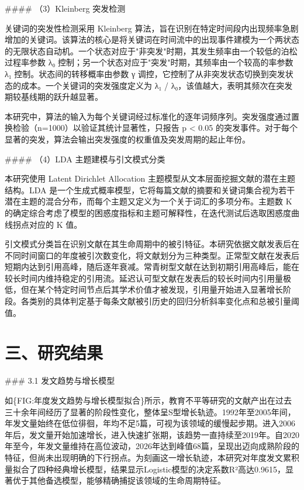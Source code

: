 \documentclass[12pt,a4paper]{article}
\begin{document}
\#\#\#\# （3）Kleinberg 突发检测

关键词的突发性检测采用 Kleinberg 算法，旨在识别在特定时间段内出现频率急剧增加的关键词。该算法的核心是将关键词在时间流中的出现事件建模为一个两状态的无限状态自动机。一个状态对应于"非突发"时期，其发生频率由一个较低的泊松过程率参数 λ₀ 控制；另一个状态对应于"突发"时期，其频率由一个较高的率参数 λ₁ 控制。状态间的转移概率由参数 γ 调控，它控制了从非突发状态切换到突发状态的成本。一个关键词的突发强度定义为 λ₁ / λ₀，该值越大，表明其频次在突发期较基线期的跃升越显著。

本研究中，算法的输入为每个关键词经过标准化的逐年词频序列。突发强度通过置换检验（n=1000）以验证其统计显著性，只报告 p < 0.05 的突发事件。对于每个显著的突发，算法会输出突发强度的权重值及突发周期的起止年份。

\#\#\#\# （4）LDA 主题建模与引文模式分类

本研究使用 Latent Dirichlet Allocation 主题模型从文本层面挖掘文献的潜在主题结构。LDA 是一个生成式概率模型，它将每篇文献的摘要和关键词集合视为若干潜在主题的混合分布，而每个主题又定义为一个关于词汇的多项分布。主题数 K 的确定综合考虑了模型的困惑度指标和主题可解释性，在迭代测试后选取困惑度曲线拐点对应的 K 值。

引文模式分类旨在识别文献在其生命周期中的被引特征。本研究依据文献发表后在不同时间窗口的年度被引次数变化，将文献划分为三种类型。正常型文献在发表后短期内达到引用高峰，随后逐年衰减。常青树型文献在达到初期引用高峰后，能在较长时间内维持稳定的引用流。延迟认可型文献在发表后的较长时间内引用量极低，但在某个特定时间节点后其学术价值才被发现，引用量开始进入显著增长阶段。各类别的具体判定基于每条文献被引历史的回归分析斜率变化点和总被引量阈值。

\section{三、研究结果}

\#\#\# 3.1 发文趋势与增长模型

如\{FIG:年度发文趋势与增长模型拟合\}所示，教育不平等研究的文献产出在过去三十余年间经历了显著的阶段性变化，整体呈S型增长轨迹。1992年至2005年间，年发文量始终在低位徘徊，年均不足5篇，可视为该领域的缓慢起步期。进入2006年后，发文量开始加速增长，进入快速扩张期，该趋势一直持续至2019年。自2020年至今，年发文量维持在高位波动，2026年达到峰值68篇，呈现出迈向成熟阶段的特征，但尚未出现明确的下行拐点。为刻画这一增长轨迹，本研究对年度发文累积量拟合了四种经典增长模型，结果显示Logistic模型的决定系数R²高达0.9615，显著优于其他备选模型，能够精确捕捉该领域的生命周期特征。
\end{document}
